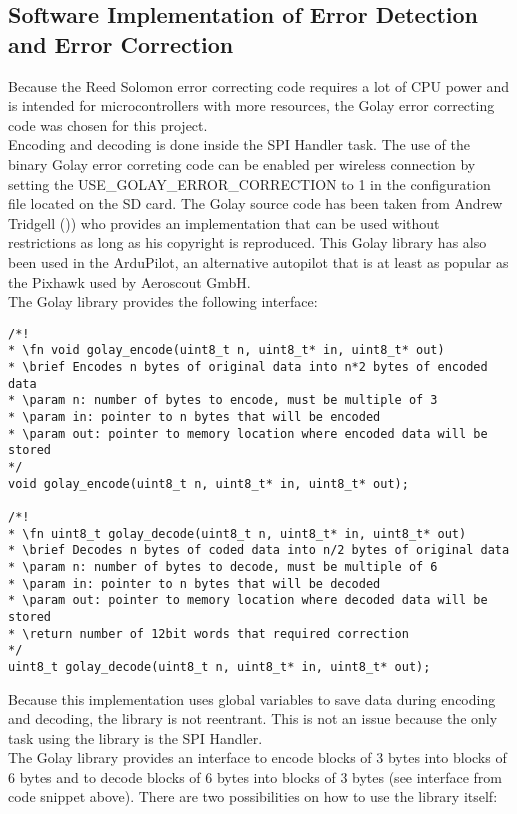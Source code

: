 \subsection{Software Implementation of Error Detection and Error Correction}
Because the Reed Solomon error correcting code requires a lot of CPU power and is intended for microcontrollers with more resources, the Golay error correcting code was chosen for this project.\\
Encoding and decoding is done inside the SPI Handler task. The use of the binary Golay error correting code can be enabled per wireless connection by setting the USE\_GOLAY\_ERROR\_CORRECTION to 1 in the configuration file located on the SD card. The Golay source code has been taken from Andrew Tridgell (\cite{GolaySourceCode})) who provides an implementation that can be used without restrictions as long as his copyright is reproduced. This Golay library has also been used in the ArduPilot, an alternative autopilot that is at least as popular as the Pixhawk used by Aeroscout GmbH.\\
The Golay library provides the following interface:
\begin{lstlisting}
/*!
* \fn void golay_encode(uint8_t n, uint8_t* in, uint8_t* out)
* \brief Encodes n bytes of original data into n*2 bytes of encoded data
* \param n: number of bytes to encode, must be multiple of 3
* \param in: pointer to n bytes that will be encoded
* \param out: pointer to memory location where encoded data will be stored
*/
void golay_encode(uint8_t n, uint8_t* in, uint8_t* out);

/*!
* \fn uint8_t golay_decode(uint8_t n, uint8_t* in, uint8_t* out)
* \brief Decodes n bytes of coded data into n/2 bytes of original data
* \param n: number of bytes to decode, must be multiple of 6
* \param in: pointer to n bytes that will be decoded
* \param out: pointer to memory location where decoded data will be stored
* \return number of 12bit words that required correction
*/
uint8_t golay_decode(uint8_t n, uint8_t* in, uint8_t* out);
\end{lstlisting}
Because this implementation uses global variables to save data during encoding and decoding, the library is not reentrant. This is not an issue because the only task using the library is the SPI Handler.\\
The Golay library provides an interface to encode blocks of 3 bytes into blocks of 6 bytes and to decode blocks of 6 bytes into blocks of 3 bytes (see interface from code snippet above). There are two possibilities on how to use the library itself:
